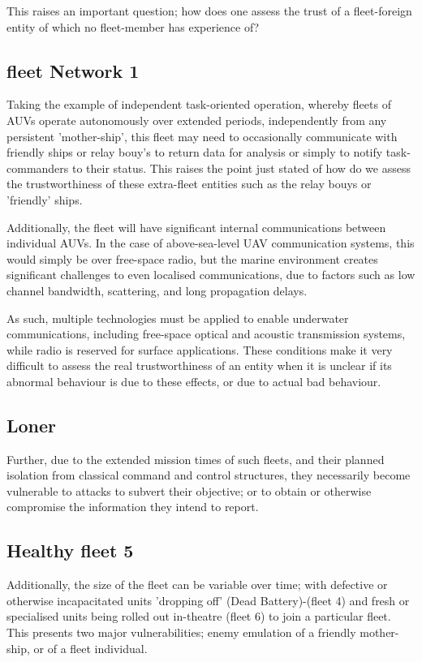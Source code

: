 \documentclass[oneside,9pt,a4paper]{Latex/Classes/PhDthesisPSnPDF}
\begin{document}
This raises an important question; how does one assess the trust of a
fleet-foreign entity of which no fleet-member has experience of?

\subsection{fleet Network 1}  Taking the example of independent task-oriented operation,
whereby fleets of AUVs operate autonomously over extended periods, independently
from any persistent 'mother-ship', this fleet may need to occasionally
communicate with friendly ships or relay bouy's to return data for analysis or
simply to notify task-commanders to their status. This raises the point just
stated of how do we assess the trustworthiness of these extra-fleet entities
such as the relay bouys or 'friendly' ships.

Additionally, the fleet will have significant internal communications between
individual AUVs. In the case of above-sea-level UAV communication systems, this
would simply be over free-space radio, but the marine environment creates
significant challenges to even localised communications, due to factors such as
low channel bandwidth, scattering, and long propagation delays.

As such, multiple technologies must be applied to enable underwater
communications, including free-space optical and acoustic transmission systems,
while radio is reserved for surface applications. These conditions make it very
difficult to assess the real trustworthiness of an entity when it is unclear if
its abnormal behaviour is due to these effects, or due to actual bad behaviour.

\subsection{Loner}  Further, due to the extended mission times of such fleets, and their
planned isolation from classical command and control structures, they
necessarily become vulnerable to attacks to subvert their objective; or to
obtain or otherwise compromise the information they intend to report.

\subsection{Healthy fleet 5}  Additionally, the size of the fleet can be variable over
time; with defective or otherwise incapacitated units 'dropping off' (Dead
Battery)-(fleet 4) and fresh or specialised units being rolled out in-theatre
(fleet 6) to join a particular fleet. This presents two major vulnerabilities;
enemy emulation of a friendly mother-ship, or of a fleet individual.
\end{document}
